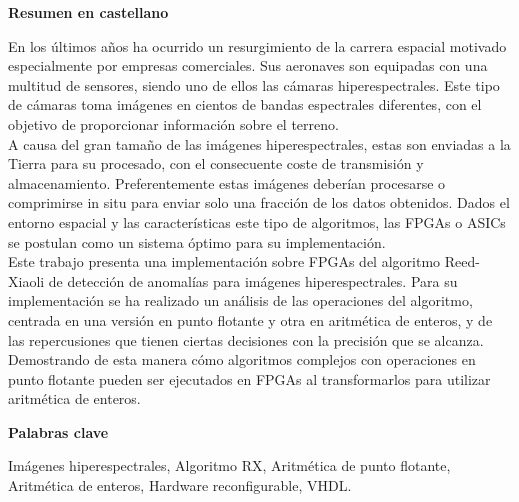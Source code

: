 
\newpage

\thispagestyle{empty}

\begin{center}

{\bf \Huge Resumen en castellano}

  \end{center}
\vspace{1cm}

En los últimos años ha ocurrido un resurgimiento de la carrera espacial motivado especialmente por empresas comerciales. Sus aeronaves son equipadas con una multitud de sensores, siendo uno de ellos las cámaras hiperespectrales. Este tipo de cámaras toma imágenes en cientos de bandas espectrales diferentes, con el objetivo de proporcionar información sobre el terreno.
\\
A causa del gran tamaño de las imágenes hiperespectrales, estas son enviadas a la Tierra para su procesado, con el consecuente coste de transmisión y almacenamiento. Preferentemente estas imágenes deberían procesarse o comprimirse in situ para enviar solo una fracción de los datos obtenidos. Dados el entorno espacial y las características este tipo de algoritmos, las FPGAs o ASICs se postulan como un sistema óptimo para su implementación.
\\
Este trabajo presenta una implementación sobre FPGAs del algoritmo Reed-Xiaoli de detección de anomalías para imágenes hiperespectrales. Para su implementación se ha realizado un análisis de las operaciones del algoritmo, centrada en una versión en punto flotante y otra en aritmética de enteros, y de las repercusiones que tienen ciertas decisiones con la precisión que se alcanza.
Demostrando de esta manera cómo algoritmos complejos con operaciones en punto flotante pueden ser ejecutados en FPGAs al transformarlos para utilizar aritmética de enteros.



\vspace{1cm}


\begin{center}

{\bf \Large Palabras clave}

   \end{center}

   \vspace{0.5cm}
   
Imágenes hiperespectrales, Algoritmo RX, Aritmética de punto flotante, Aritmética de enteros, Hardware reconfigurable, VHDL.   


